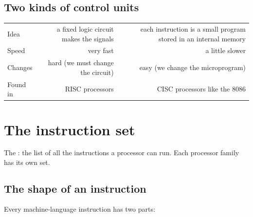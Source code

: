 \subsection{Two kinds of control units}
\begin{center}
\begin{tabularx}{\linewidth}{|>{\centering\arraybackslash}p{3.2cm}|R|R|}
    \hline
    \ras{} &  &  \\ \hline
    Idea & a fixed logic circuit makes the signals & each instruction is a small program stored in an internal memory \\ \hline
    Speed & very fast & a little slower \\ \hline
    Changes & hard (we must change the circuit) & easy (we change the microprogram) \\ \hline
    Found in & RISC processors & CISC processors like the 8086 \\ \hline
\end{tabularx}
\end{center}

\section{The instruction set}

\begin{tarif}
    The : the list of all the instructions a processor can run.
    Each processor family has its own set.
\end{tarif}

\subsection{The shape of an instruction}
Every machine-language instruction has two parts:

\begin{center}
\end{center}

